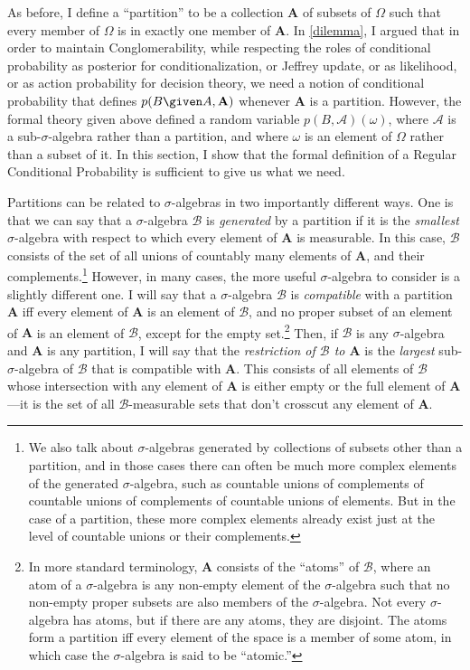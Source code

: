As before, I define a ``partition'' to be a collection $\mathbf{A}$ of subsets of $\Omega$ such that every member of $\Omega$ is in exactly one member of $\mathbf{A}$. In \autoref{dilemma}, I argued that in order to maintain Conglomerability, while respecting the roles of conditional probability as posterior for conditionalization, or Jeffrey update, or as likelihood, or as action probability for decision theory, we need a notion of conditional probability that defines $p(B \given A,\mathbf{A})$ whenever $\mathbf{A}$ is a partition. However, the formal theory given above defined a random variable $p(B,\mathcal{A})(\omega)$, where $\mathcal{A}$ is a sub-$\sigma$-algebra rather than a partition, and where $\omega$ is an element of $\Omega$ rather than a subset of it. In this section, I show that the formal definition of a Regular Conditional Probability is sufficient to give us what we need.

Partitions can be related to $\sigma$-algebras in two importantly different ways. One is that we can say that a $\sigma$-algebra $\mathcal{B}$ is \textit{generated} by a partition if it is the \emph{smallest} $\sigma$-algebra with respect to which every element of $\mathbf{A}$ is measurable. In this case, $\mathcal{B}$ consists of the set of all unions of countably many elements of $\mathbf{A}$, and their complements.\footnote{We also talk about $\sigma$-algebras generated by collections of subsets other than a partition, and in those cases there can often be much more complex elements of the generated $\sigma$-algebra, such as countable unions of complements of countable unions of complements of countable unions of elements. But in the case of a partition, these more complex elements already exist just at the level of countable unions or their complements.} However, in many cases, the more useful $\sigma$-algebra to consider is a slightly different one. I will say that a $\sigma$-algebra $\mathcal{B}$ is \textit{compatible} with a partition $\mathbf{A}$ iff every element of $\mathbf{A}$ is an element of $\mathcal{B}$, and no proper subset of an element of $\mathbf{A}$ is an element of $\mathcal{B}$, except for the empty set.\footnote{In more standard terminology, $\mathbf{A}$ consists of the ``atoms'' of $\mathcal{B}$, where an atom of a $\sigma$-algebra is any non-empty element of the $\sigma$-algebra such that no non-empty proper subsets are also members of the $\sigma$-algebra. Not every $\sigma$-algebra has atoms, but if there are any atoms, they are disjoint. The atoms form a partition iff every element of the space is a member of some atom, in which case the $\sigma$-algebra is said to be ``atomic.''} Then, if $\mathcal{B}$ is any $\sigma$-algebra and $\mathbf{A}$ is any partition, I will say that the \textit{restriction of $\mathcal{B}$ to $\mathbf{A}$} is the \emph{largest} sub-$\sigma$-algebra of $\mathcal{B}$ that is compatible with $\mathbf{A}$. This consists of all elements of $\mathcal{B}$ whose intersection with any element of $\mathbf{A}$ is either empty or the full element of $\mathbf{A}$---it is the set of all $\mathcal{B}$-measurable sets that don't crosscut any element of $\mathbf{A}$.

